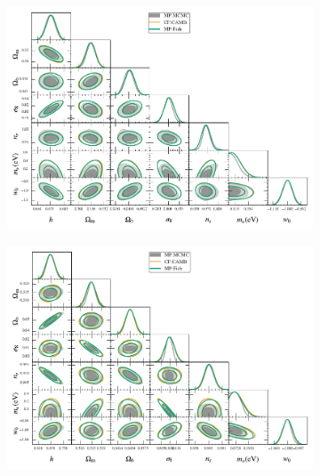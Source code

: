 \documentclass[oneside]{book}
\begin{document}
\begin{figure}
    \centering
    \caption{Same as figure \ref{fig:w0wa_triangle} but for the $w_0$CDM+$m_\nu$ model.}
    \begin{subfigure}[b]{0.49\textwidth}
        \centering
        \includegraphics[width=\textwidth]{S_w0M_validation.pdf}
    \end{subfigure}
    \hfill
    \begin{subfigure}[b]{0.49\textwidth}
        \centering
        \includegraphics[width=\textwidth]{P_w0M_validation.pdf}
    \end{subfigure}
       \label{fig:w0M_triangle} 
\end{figure}
\end{document}
